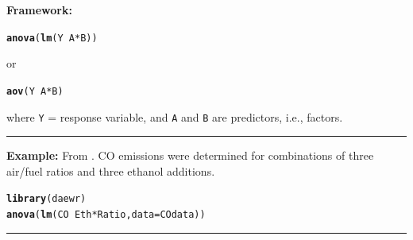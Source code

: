 \documentclass[12pt,english]{article}\usepackage[]{graphicx}\usepackage[table]{xcolor}
\makeatletter
\newcommand{\hlopt}[1]{\textcolor[rgb]{0,0,0}{#1}}%
\newcommand{\hldef}[1]{\textcolor[rgb]{0.345,0.345,0.345}{#1}}%
\newcommand{\hlkwc}[1]{\textcolor[rgb]{0.333,0.667,0.333}{#1}}%
\newcommand{\hlkwd}[1]{\textcolor[rgb]{0.737,0.353,0.396}{\textbf{#1}}}%
\newenvironment{kframe}{%
 \def\at@end@of@kframe{}%
 \ifinner\ifhmode%
  \def\at@end@of@kframe{\end{minipage}}%
  \begin{minipage}{\columnwidth}%
 \fi\fi%
 \def\FrameCommand##1{\hskip\@totalleftmargin \hskip-\fboxsep
 \colorbox{shadecolor}{##1}\hskip-\fboxsep
     \hskip-\linewidth \hskip-\@totalleftmargin \hskip\columnwidth}%
 \MakeFramed {\advance\hsize-\width
   \@totalleftmargin\z@ \linewidth\hsize
   \@setminipage}}%
 {\par\unskip\endMakeFramed%
 \at@end@of@kframe}
\newenvironment{knitrout}{}{} %
\makeatother
\begin{document}
\begin{tcolorbox}[colback=yellow!50!red!25!white,colbacktitle=yellow!50!red,colframe=black!75!white,title=\textbf{R:} Two Way Factorial -- Two Fixed Factors]
\textbf{Framework:}\\
\vspace{-.2in}
\begin{knitrout}
\color{fgcolor}\begin{kframe}
\begin{alltt}
\hlkwd{anova}\hldef{(}\hlkwd{lm}\hldef{(Y} \hlopt{~} \hldef{A} \hlopt{*} \hldef{B))}
\end{alltt}
\end{kframe}
\end{knitrout}
\vspace{-.1in}
or
\vspace{-.1in}
\begin{knitrout}
\color{fgcolor}\begin{kframe}
\begin{alltt}
\hlkwd{aov}\hldef{(Y} \hlopt{~} \hldef{A} \hlopt{*} \hldef{B)}
\end{alltt}
\end{kframe}
\end{knitrout}
where \texttt{Y} = response variable, and \texttt{A} and \texttt{B} are predictors, i.e., factors.
\vspace{0.1in}
\par\noindent\rule{.9\textwidth}{0.4pt}
\textbf{Example:} From \citep[][pg 65]{lawson}.  CO emissions were determined for combinations of three air/fuel ratios and three ethanol additions.
\vspace{-.1in}
\begin{knitrout}
\color{fgcolor}\begin{kframe}
\begin{alltt}
\hlkwd{library}\hldef{(daewr)}
\hlkwd{anova}\hldef{(}\hlkwd{lm}\hldef{(CO} \hlopt{~} \hldef{Eth} \hlopt{*} \hldef{Ratio,} \hlkwc{data} \hldef{= COdata))}
\end{alltt}
\end{kframe}
\end{knitrout}

\end{tcolorbox}
\par\noindent\rule{.9\textwidth}{0.4pt}
\end{document}
